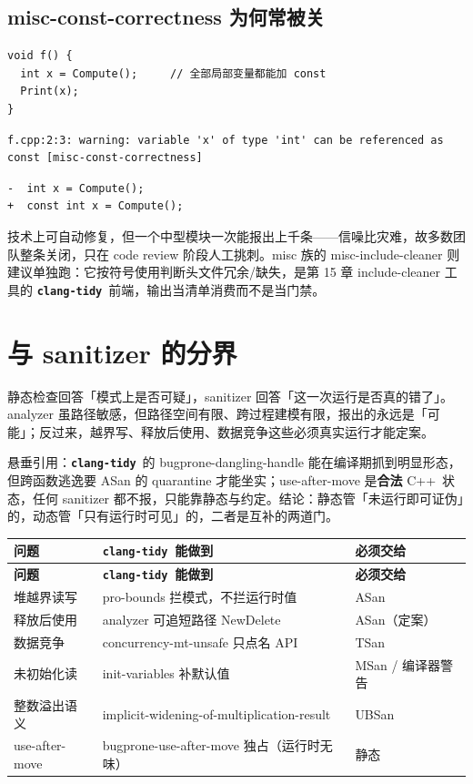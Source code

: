 \documentclass[12pt,a4paper,fontset=fandol]{ctexbook}
\newcommand{\Lib}[1]{\textbf{\texttt{#1}}}
\newcommand{\Lang}[1]{\textsf{#1}}
\newcommand{\CPP}{\Lang{C++}}
\newcommand{\Tidy}{\Lib{clang-tidy}}
\begin{document}
\subsection{misc-const-correctness 为何常被关}\label{sec:ch13-s7c}
\begin{lstlisting}[style=cppstyle]
void f() {
  int x = Compute();     // 全部局部变量都能加 const
  Print(x);
}
\end{lstlisting}
\begin{lstlisting}[style=shellstyle]
f.cpp:2:3: warning: variable 'x' of type 'int' can be referenced as const [misc-const-correctness]
\end{lstlisting}
\begin{lstlisting}[style=diffstyle]
-  int x = Compute();
+  const int x = Compute();
\end{lstlisting}
技术上可自动修复，但一个中型模块一次能报出上千条——信噪比灾难，故多数团队整条关闭，只在 code review 阶段人工挑刺。misc 族的 misc-include-cleaner 则建议单独跑：它按符号使用判断头文件冗余/缺失，是第 15 章 include-cleaner 工具的 \Tidy\ 前端，输出当清单消费而不是当门禁。

\section{与 sanitizer 的分界}\label{sec:ch13-s8}
静态检查回答「模式上是否可疑」，sanitizer 回答「这一次运行是否真的错了」。analyzer 虽路径敏感，但路径空间有限、跨过程建模有限，报出的永远是「可能」；反过来，越界写、释放后使用、数据竞争这些必须真实运行才能定案。
\begin{compare}[title={同一种坏味的两种执法}]
悬垂引用：\Tidy\ 的 bugprone-dangling-handle 能在编译期抓到明显形态，但跨函数逃逸要 ASan 的 quarantine 才能坐实；use-after-move 是\textbf{合法} \CPP\ 状态，任何 sanitizer 都不报，只能靠静态与约定。结论：静态管「未运行即可证伪」的，动态管「只有运行时可见」的，二者是互补的两道门。
\end{compare}
{\small
\begin{longtable}{>{\raggedright\arraybackslash}p{} >{\raggedright\arraybackslash}p{} >{\raggedright\arraybackslash}p{}}
\textbf{问题} & \textbf{\Tidy\ 能做到} & \textbf{必须交给}\\ \midrule
\endfirsthead
\textbf{问题} & \textbf{\Tidy\ 能做到} & \textbf{必须交给}\\ \midrule
\endhead
堆越界读写 & pro-bounds 拦模式，不拦运行时值 & ASan\\
释放后使用 & analyzer 可追短路径 NewDelete & ASan（定案）\\
数据竞争 & concurrency-mt-unsafe 只点名 API & TSan\\
未初始化读 & init-variables 补默认值 & MSan / 编译器警告\\
整数溢出语义 & implicit-widening-of-multiplication-result & UBSan\\
use-after-move & bugprone-use-after-move 独占（运行时无味） & 静态\\
\end{longtable}}
\end{document}
